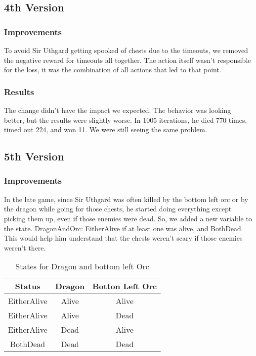 \documentclass{article}
\begin{document}
  \subsection{4th Version}

  \subsubsection{Improvements}

  To avoid Sir Uthgard getting spooked of chests due to the timeouts, we removed the negative reward for timeouts all together. The action itself wasn't responsible for the loss, it was the combination of all actions that led to that point.  
  
  \subsubsection{Results}

  The change didn't have the impact we expected. The behavior was looking better, but the results were slightly worse. In 1005 iterations, he died 770 times, timed out 224, and won 11. We were still seeing the same problem.

  \subsection{5th Version}

  \subsubsection{Improvements}
  
  In the late game, since Sir Uthgard was often killed by the bottom left orc or by the dragon while going for those chests, he started doing everything except picking them up, even if those enemies were dead.
  So, we added a new variable to the state. DragonAndOrc: EitherAlive if at least one was alive, and BothDead. This would help him understand that the chests weren't scary if those enemies weren't there. 

  \begin{table}[h!]
    \centering
    \caption{States for Dragon and bottom left Orc}
    \label{tab:tableA*7}
    \begin{tabular}{c|c|c}
      \textbf{Status} & \textbf{Dragon} & \textbf{Botton Left Orc}\\
      \hline
      EitherAlive & Alive & Alive\\
      EitherAlive & Alive & Dead\\
      EitherAlive & Dead & Alive\\
      BothDead & Dead & Dead\\
    \end{tabular}
  \end{table}
\end{document}
